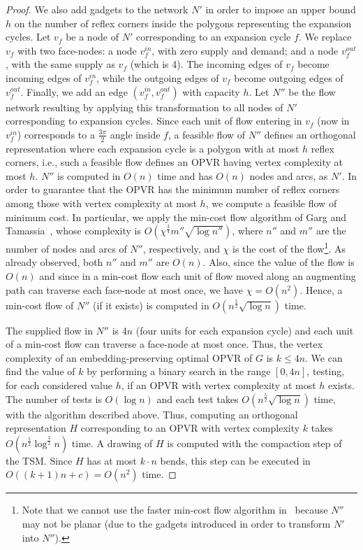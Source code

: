 \documentclass{article}
\newcommand{\pt}{\frac{3\pi}{2}}
\newcommand{\opvr}{OPVR\xspace}
\begin{document}
\begin{proof}
We also add gadgets to the network $N'$ in order to impose an upper bound $h$ on the number of reflex corners inside the polygons representing the expansion cycles. Let $v_f$ be a node of $N'$ corresponding to an expansion cycle $f$. We replace $v_f$ with two face-nodes: a node $v_f^{in}$, with zero supply and demand; and a node $v_f^{out}$, with the same supply as $v_f$ (which is 4). The incoming edges of $v_f$ become incoming edges of $v_f^{in}$, while the outgoing edges of $v_f$ become outgoing edges of $v_f^{out}$. Finally, we add an edge $(v_f^{in},v_f^{out})$ with capacity $h$. Let $N''$ be the flow network resulting by applying this transformation to all nodes of $N'$ corresponding to expansion cycles. Since each unit of flow entering in $v_f$ (now in $v_f^{in}$) corresponds to a $\pt$ angle inside $f$, a feasible flow of $N''$ defines an orthogonal representation where each expansion cycle is a polygon with at most $h$ reflex corners, i.e., such a feasible flow defines an \opvr having vertex complexity at most $h$. $N''$ is computed in $O(n)$ time and has $O(n)$ nodes and arcs, as $N'$. In order to guarantee that the \opvr has the minimum number of reflex corners among those with vertex complexity at most $h$, we compute a feasible flow of minimum cost. In particular, we apply the min-cost flow algorithm of Garg and Tamassia~\cite{Garg1997}, whose complexity is $O(\chi^{\frac{3}{4}}{m''}\sqrt{\log {n''}})$, where $n''$ and $m''$ are the number of nodes and arcs of $N''$, respectively, and $\chi$ is the cost of the flow\footnote{Note that we cannot use the faster min-cost flow algorithm in~\cite{DBLP:journals/jgaa/CornelsenK12} because $N''$ may not be planar (due to the gadgets introduced in order to transform $N'$ into $N''$).}. As already observed, both $n''$ and $m''$ are $O(n)$. Also, since the value of the flow is $O(n)$ and since in a min-cost flow each unit of flow moved along an augmenting path can traverse each face-node at most once, we have $\chi = O(n^2)$. Hence, a min-cost flow of $N''$ (if it exists) is computed in $O(n^{\frac{5}{2}}\sqrt{\log n})$ time. 

The supplied flow in $N''$ is $4n$ (four units for each expansion cycle) and each unit of a min-cost flow can traverse a face-node at most once. Thus, the vertex complexity of an embedding-preserving optimal \opvr of $G$ is $k \leq 4n$. We can find the value of $k$ by performing a binary search in the range $[0,4n]$, testing, for each considered value $h$, if an \opvr with vertex complexity at most $h$ exists. The number of tests is $O(\log n)$ and each test takes $O(n^{\frac{5}{2}}\sqrt{\log n})$ time, with the algorithm described above. Thus, computing an orthogonal representation $H$ corresponding to an \opvr with vertex complexity $k$ takes $O(n^{\frac{5}{2}}\log^{\frac{3}{2}}n)$ time. A drawing of $H$ is computed with the compaction step of the TSM. Since $H$ has at most $k \cdot n$ bends, this step can be executed in $O((k+1)n+c)=O(n^2)$ time.
\end{proof}
\end{document}
